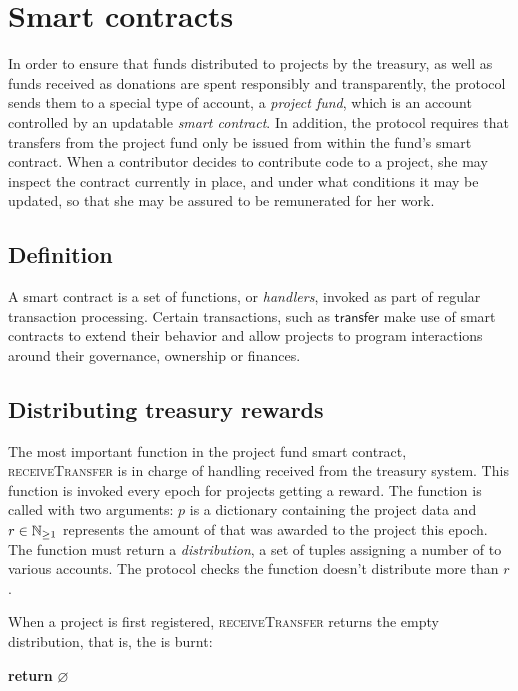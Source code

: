 
\section{Smart contracts}
\label{s:smart-contracts}

\newcommand{\handler}[1]{\textsc{\small#1}}

In order to ensure that funds distributed to projects by the \oscoin{}
treasury, as well as funds received as donations are spent responsibly and
transparently, the protocol sends them to a special type of account, a
\emph{project fund}, which is an account controlled by an updatable \emph{smart
contract}.
In addition, the protocol requires that transfers from the project fund only be
issued from within the fund's smart contract. When a contributor decides to
contribute code to a project, she may inspect the contract currently in place,
and under what conditions it may be updated, so that she may be assured to be
remunerated for her work.

\subsection{Definition}
A smart contract is a set of functions, or \emph{handlers}, invoked as part
of regular transaction processing. Certain transactions, such as $\mathsf{transfer}$
make use of smart contracts to extend their behavior and allow projects to
program interactions around their governance, ownership or finances.

\subsection{Distributing treasury rewards}

The most important function in the project fund smart contract,
\handler{receiveTransfer} is in charge of handling \oscoin{} received from the
treasury system. This function is invoked every epoch for projects getting a
reward. The function is called with two arguments: $p$ is a dictionary
containing the project data and $r \in \mathbb{N}_{\geq 1}$ represents the amount of
\oscoin{} that was awarded to the project this epoch. The function must return
a \emph{distribution}, a set of tuples assigning a number of \oscoin{} to
various accounts. The protocol checks the function doesn't distribute more than
$r$.

When a project is first registered, \handler{receiveTransfer} returns the empty
distribution, that is, the \oscoin{} is burnt:
\begin{algorithmic}[0]
        \State \textbf{return} $\varnothing$
    \EndProcedure
\end{algorithmic}

